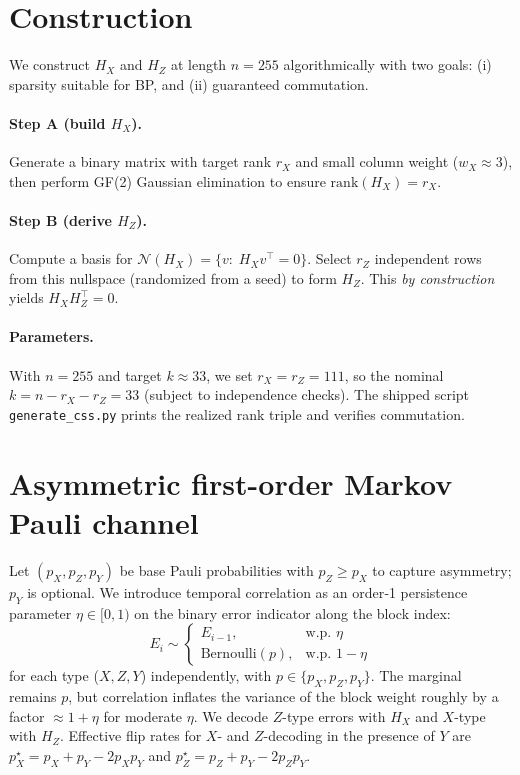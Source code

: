\documentclass[11pt]{article}
\begin{document}
\section{Construction}
\label{sec:construction}
We construct \(H_X\) and \(H_Z\) at length \(n=255\) algorithmically with
two goals: (i) sparsity suitable for BP, and (ii) guaranteed commutation.

\paragraph{Step A (build \(H_X\)).}
Generate a binary matrix with target rank \(r_X\) and small column weight
(\(w_X\approx 3\)), then perform GF(2) Gaussian elimination to ensure
\(\mathrm{rank}(H_X)=r_X\).

\paragraph{Step B (derive \(H_Z\)).}
Compute a basis for \(\mathcal{N}(H_X) = \{ v:\; H_X v^\top=0\}\).
Select \(r_Z\) independent rows from this nullspace (randomized from a seed)
to form \(H_Z\). This \emph{by construction} yields \(H_X H_Z^\top=0\).

\paragraph{Parameters.}
With \(n=255\) and target \(k\approx 33\), we set \(r_X=r_Z=111\), so
the nominal \(k=n-r_X-r_Z=33\) (subject to independence checks).
The shipped script \texttt{generate\_css.py} prints the realized
rank triple and verifies commutation.

\section{Asymmetric first-order Markov Pauli channel}
\label{sec:channel}
Let \((p_X,p_Z,p_Y)\) be base Pauli probabilities with \(p_Z \ge p_X\) to
capture asymmetry; \(p_Y\) is optional. We introduce temporal correlation as
an order‑1 persistence parameter \(\eta\in[0,1)\) on the binary error
indicator along the block index:
\[
E_i \sim \begin{cases}
  E_{i-1}, & \text{w.p. }\eta\\
  \mathrm{Bernoulli}(p), & \text{w.p. }1-\eta
\end{cases}
\]
for each type (\(X,Z,Y\)) independently, with \(p\in\{p_X,p_Z,p_Y\}\).
The marginal remains \(p\), but correlation inflates the variance of the block
weight roughly by a factor \(\approx 1+\eta\) for moderate \(\eta\).
We decode \(Z\)-type errors with \(H_X\) and \(X\)-type with \(H_Z\).
Effective flip rates for \(X\)- and \(Z\)-decoding in the presence of \(Y\)
are \(p_X^\star=p_X+p_Y-2p_Xp_Y\) and \(p_Z^\star=p_Z+p_Y-2p_Zp_Y\).
\end{document}
